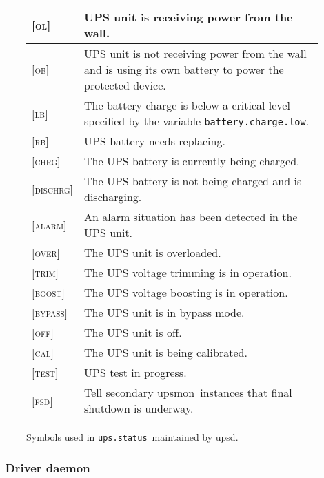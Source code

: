 \documentclass[12pt]{article}
\newlength{\headersep}\setlength{\headersep}{3mm}
\newcommand{\Hsep}{\hspace{\headersep}}
\newcommand{\newcolumn}{\vfill\eject}
\newcommand{\upsd}{\mbox{\textcolor{UPSDCOLOUR}{upsd}}}
\newcommand{\upsmon}{\mbox{\textcolor{MONCOLOUR}{upsmon}}}
\newcommand{\ALARM}{\textcolor{UPSDCOLOUR}{\textsc{alarm}}}
\newcommand{\BOOST}{\textcolor{UPSDCOLOUR}{\textsc{boost}}}
\newcommand{\BYPASS}{\textcolor{UPSDCOLOUR}{\textsc{bypass}}}
\newcommand{\CAL}{\textcolor{UPSDCOLOUR}{\textsc{cal}}}
\newcommand{\CHRG}{\textcolor{UPSDCOLOUR}{\textsc{chrg}}}
\newcommand{\DISCHRG}{\textcolor{UPSDCOLOUR}{\textsc{dischrg}}}
\newcommand{\FSDst}{\textcolor{UPSDCOLOUR}{\textsc{fsd}}}
\newcommand{\LB}{\textcolor{UPSDCOLOUR}{\textsc{lb}}}
\newcommand{\OB}{\textcolor{UPSDCOLOUR}{\textsc{ob}}}
\newcommand{\OFF}{\textcolor{UPSDCOLOUR}{\textsc{off}}}
\newcommand{\OL}{\textcolor{UPSDCOLOUR}{\textsc{ol}}}
\newcommand{\OVER}{\textcolor{UPSDCOLOUR}{\textsc{over}}}
\newcommand{\RB}{\textcolor{UPSDCOLOUR}{\textsc{rb}}}
\newcommand{\TEST}{\textcolor{UPSDCOLOUR}{\textsc{test}}}
\newcommand{\TRIM}{\textcolor{UPSDCOLOUR}{\textsc{trim}}}
\newcommand{\status}[1]{\textcolor{UPSDCOLOUR}{[{#1}]}}
\newcommand{\batterychargelow}{\textcolor{UPSDCOLOUR}{\texttt{battery{\allowbreak}.charge{\allowbreak}.low}}}
\newcommand{\upsstatus}{\textcolor{UPSDCOLOUR}{\texttt{ups{\allowbreak}.status}}}
\begin{document}
\begin{figure}[htb]
\begin{center}
\begin{tabular}{|l|p{0.7\LinePrinterwidth}|}
\hline
\status{\OL}      & UPS unit is receiving power from the wall.  \\ \hline
\status{\OB}      & UPS unit is not receiving power from the wall and is using its
                    own battery to power the protected device. \\ \hline
\status{\LB}      & The battery charge is below a critical level specified by the 
                    variable \batterychargelow. \\ \hline
\status{\RB}      & UPS battery needs replacing.  \\ \hline
\status{\CHRG}    & The UPS battery is currently being charged. \\ \hline
\status{\DISCHRG} & The UPS battery is not being charged and is discharging.  \\ \hline
\status{\ALARM}   & An alarm situation has been detected in the UPS unit. \\ \hline
\status{\OVER}    & The UPS unit is overloaded. \\ \hline
\status{\TRIM}    & The UPS voltage trimming is in operation. \\ \hline
\status{\BOOST}   & The UPS voltage boosting is in operation. \\ \hline
\status{\BYPASS}  & The UPS unit is in bypass mode. \\ \hline
\status{\OFF}     & The UPS unit is off. \\ \hline
\status{\CAL}     & The UPS unit is being calibrated. \\ \hline
\status{\TEST}    & UPS test in progress. \\ \hline
\status{\FSDst}   & Tell secondary \upsmon\ instances that final shutdown is underway. \\ \hline
\end{tabular}
\caption{Symbols used in \upsstatus\ maintained by \upsd.\label{fig:statussymbols}}
\end{center}
\end{figure}

\newcolumn
\subsubsection{\Hsep\ Driver daemon}\label{section:driver}
\end{document}
